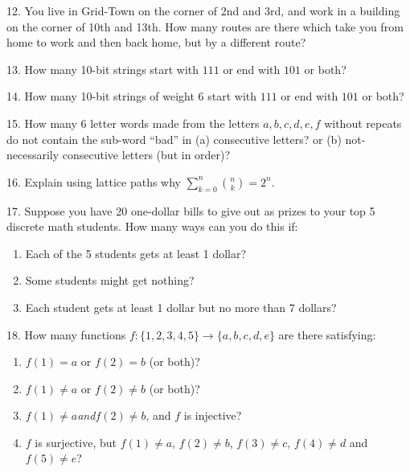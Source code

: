 \documentclass[10pt,]{book}
\theoremstyle{plain}
\theoremstyle{definition}
\theoremstyle{definition}
\theoremstyle{definition}
\numberwithin{equation}{chapter}
\begin{document}
\begin{exerciselist}
\par\smallskip
\item[12.]\hypertarget{exercise-113}{}
            You live in Grid-Town on the corner of 2nd and 3rd, and work in a building on the corner of 10th and 13th. How many routes are there which take you from home to work and then back home, but by a different route?
\par\smallskip
\item[13.]\hypertarget{exercise-114}{}
            How many 10-bit strings start with \(111\) or end with \(101\) or both?
\par\smallskip
\item[14.]\hypertarget{exercise-115}{}
            How many 10-bit strings of weight 6 start with \(111\) or end with \(101\) or both?
\par\smallskip
\item[15.]\hypertarget{exercise-116}{}
            How many 6 letter words made from the letters \(a,b,c,d,e,f\) without repeats do not contain the sub-word ``bad'' in (a) consecutive letters? or (b) not-necessarily consecutive letters (but in order)?
\par\smallskip
\item[16.]\hypertarget{exercise-117}{}
            Explain using lattice paths why \(\sum_{k=0}^n {n \choose k} = 2^n\).
\par\smallskip
\item[17.]\hypertarget{exercise-118}{}
            Suppose you have 20 one-dollar bills to give out as prizes to your top 5 discrete math students. How many ways can you do this if:
          \leavevmode%
\begin{enumerate}[label=(\alph*)]
\item\hypertarget{li-747}{}
                Each of the 5 students gets at least 1 dollar?
\item\hypertarget{li-748}{}
                Some students might get nothing?
\item\hypertarget{li-749}{}
                Each student gets at least 1 dollar but no more than 7 dollars?
\end{enumerate}

\par\smallskip
\item[18.]\hypertarget{exercise-119}{}
            How many functions \(f: \{1,2,3,4,5\} \to \{a,b,c,d,e\}\) are there satisfying:
          \leavevmode%
\begin{enumerate}[label=(\alph*)]
\item\hypertarget{li-753}{}\(f(1) = a\) or \(f(2) = b\) (or both)?%
\item\hypertarget{li-754}{}\(f(1) \ne a\) or \(f(2) \ne b\) (or both)?%
\item\hypertarget{li-755}{}\(f(1) \ne a\)\emph{and}\(f(2) \ne b\), and \(f\) is injective?%
\item\hypertarget{li-756}{}
                \(f\) is surjective, but \(f(1) \ne a\), \(f(2) \ne b\), \(f(3) \ne c\), \(f(4) \ne d\) and \(f(5) \ne e\)?
\end{enumerate}


\end{exerciselist}
\end{document}
